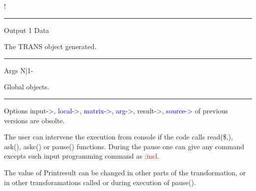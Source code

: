 	!
\vspace{0.3cm}
\hrule
\vspace{0.3cm}
\noindent Output \tabto{3cm} 1 \tabto{5cm}  Data \tabto{7cm}
\begin{changemargin}{3cm}{0cm}
\noindent The TRANS object generated.
\end{changemargin}
\vspace{0.3cm}
\hrule
\vspace{0.3cm}
\noindent Args \tabto{3cm} N|1- \tabto{5cm}    \tabto{7cm}
\begin{changemargin}{3cm}{0cm}
\noindent  Global objects.
\end {changemargin}
\hrule
\vspace{0.2cm}
\begin{note}
Options input->, \textcolor{blue}{local->}, \textcolor{blue}{matrix->}, \textcolor{blue}{arg->}, result->, \textcolor{blue}{source->} of previous
versions are obsolte.
\end{note}
\begin{note}
The user can intervene the execution from console if the code calls \textcolor{VioletRed}{read}(\$,),
\textcolor{VioletRed}{ask}(), \textcolor{VioletRed}{askc}() or \textcolor{VioletRed}{pause}() functions. During the pause one can give any command excepts
such input programming command as \textcolor{Red}{;incl}.
\end{note}
\begin{note}
The value of Printresult can be changed in other parts of the transformation, or
in other transforamations called or during execution of \textcolor{VioletRed}{pause}().
\end{note}

